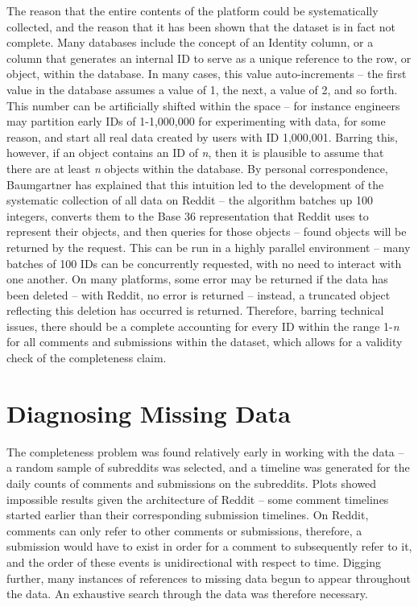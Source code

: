 \documentclass[letterpaper,12pt]{article}
\begin{document}
The reason that the entire contents of the platform could be systematically collected, and the reason that it has been shown that the dataset is in fact not complete. Many databases include the concept of an Identity column, or a column that generates an internal ID to serve as a unique reference to the row, or object, within the database. In many cases, this value auto-increments -- the first value in the database assumes a value of 1, the next, a value of 2, and so forth. This number can be artificially shifted within the space -- for instance engineers may partition early IDs of 1-1,000,000 for experimenting with data, for some reason, and start all real data created by users with ID 1,000,001. Barring this, however, if an object contains an ID of \textit{n}, then it is plausible to assume that there are at least \textit{n} objects within the database. By personal correspondence, Baumgartner has explained that this intuition led to the development of the systematic collection of all data on Reddit -- the algorithm batches up 100 integers, converts them to the Base 36 representation that Reddit uses to represent their objects, and then queries for those objects -- found objects will be returned by the request. This can be run in a highly parallel environment -- many batches of 100 IDs can be concurrently requested, with no need to interact with one another. On many platforms, some error may be returned if the data has been deleted -- with Reddit, no error is returned -- instead, a truncated object reflecting this deletion has occurred is returned. Therefore, barring technical issues, there should be a complete accounting for every ID within the range 1-\textit{n} for all comments and submissions within the dataset, which allows for a validity check of the completeness claim.

\section{Diagnosing Missing Data}

The completeness problem was found relatively early in working with the data -- a random sample of subreddits was selected, and a timeline was generated for the daily counts of comments and submissions on the subreddits. Plots showed impossible results given the architecture of Reddit -- some comment timelines started earlier than their corresponding submission timelines. On Reddit, comments can only refer to other comments or submissions, therefore, a submission would have to exist in order for a comment to subsequently refer to it, and the order of these events is unidirectional with respect to time. Digging further, many instances of references to missing data begun to appear throughout the data. An exhaustive search through the data was therefore necessary. 
\end{document}
